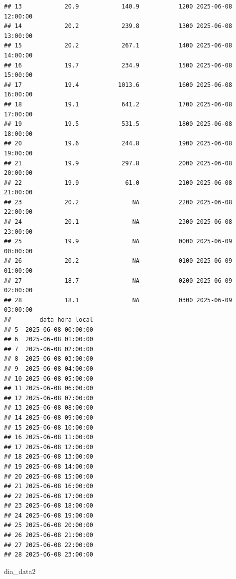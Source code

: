 \documentclass[
]{article}
\newenvironment{Shaded}{\begin{snugshade}}{\end{snugshade}}
\newcommand{\NormalTok}[1]{#1}
\begin{document}
\begin{verbatim}
## 13            20.9            140.9           1200 2025-06-08 12:00:00
## 14            20.2            239.8           1300 2025-06-08 13:00:00
## 15            20.2            267.1           1400 2025-06-08 14:00:00
## 16            19.7            234.9           1500 2025-06-08 15:00:00
## 17            19.4           1013.6           1600 2025-06-08 16:00:00
## 18            19.1            641.2           1700 2025-06-08 17:00:00
## 19            19.5            531.5           1800 2025-06-08 18:00:00
## 20            19.6            244.8           1900 2025-06-08 19:00:00
## 21            19.9            297.8           2000 2025-06-08 20:00:00
## 22            19.9             61.0           2100 2025-06-08 21:00:00
## 23            20.2               NA           2200 2025-06-08 22:00:00
## 24            20.1               NA           2300 2025-06-08 23:00:00
## 25            19.9               NA           0000 2025-06-09 00:00:00
## 26            20.2               NA           0100 2025-06-09 01:00:00
## 27            18.7               NA           0200 2025-06-09 02:00:00
## 28            18.1               NA           0300 2025-06-09 03:00:00
##        data_hora_local
## 5  2025-06-08 00:00:00
## 6  2025-06-08 01:00:00
## 7  2025-06-08 02:00:00
## 8  2025-06-08 03:00:00
## 9  2025-06-08 04:00:00
## 10 2025-06-08 05:00:00
## 11 2025-06-08 06:00:00
## 12 2025-06-08 07:00:00
## 13 2025-06-08 08:00:00
## 14 2025-06-08 09:00:00
## 15 2025-06-08 10:00:00
## 16 2025-06-08 11:00:00
## 17 2025-06-08 12:00:00
## 18 2025-06-08 13:00:00
## 19 2025-06-08 14:00:00
## 20 2025-06-08 15:00:00
## 21 2025-06-08 16:00:00
## 22 2025-06-08 17:00:00
## 23 2025-06-08 18:00:00
## 24 2025-06-08 19:00:00
## 25 2025-06-08 20:00:00
## 26 2025-06-08 21:00:00
## 27 2025-06-08 22:00:00
## 28 2025-06-08 23:00:00
\end{verbatim}

\begin{Shaded}
\begin{Highlighting}[]
\NormalTok{dia\_data2}
\end{Highlighting}
\end{Shaded}
\end{document}
